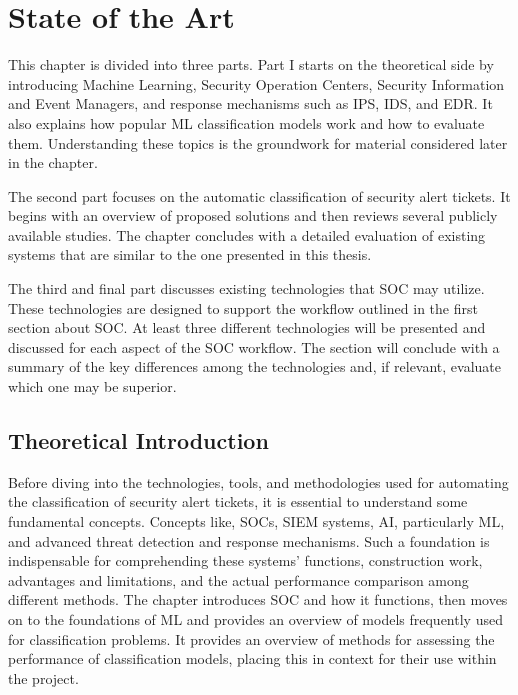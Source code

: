 \chapter{State of the Art}
\label{chap:Chapter2}

This chapter is divided into three parts. 
Part I starts on the theoretical side by introducing Machine Learning, Security Operation Centers, Security Information and Event Managers, and response mechanisms such as \gls{IPS}, \gls{IDS}, and \gls{EDR}. 
It also explains how popular \gls{ML} classification models work and how to evaluate them. 
Understanding these topics is the groundwork for material considered later in the chapter.

The second part focuses on the automatic classification of security alert tickets. 
It begins with an overview of proposed solutions and then reviews several publicly available studies. 
The chapter concludes with a detailed evaluation of existing systems that are similar to the one presented in this thesis. 

The third and final part discusses existing technologies that \gls{SOC} may utilize. 
These technologies are designed to support the workflow outlined in the first section about \gls{SOC}. 
At least three different technologies will be presented and discussed for each aspect of the \gls{SOC} workflow. 
The section will conclude with a summary of the key differences among the technologies and, if relevant, evaluate which one may be superior.

\section{Theoretical Introduction}

Before diving into the technologies, tools, and methodologies used for automating the classification of security alert tickets, it is essential to understand some fundamental concepts. 
Concepts like, \gls{SOC}s, \gls{SIEM} systems, \gls{AI}, particularly \gls{ML}, and advanced threat detection and response mechanisms. 
Such a foundation is indispensable for comprehending these systems' functions, construction work, advantages and limitations, and the actual performance comparison among different methods. 
The chapter introduces \gls{SOC} and how it functions, then moves on to the foundations of \gls{ML} and provides an overview of models frequently used for classification problems. 
It provides an overview of methods for assessing the performance of classification models, placing this in context for their use within the project.

